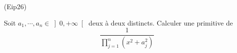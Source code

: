 \begin{tiny}(Eip26)\end{tiny} Soit $a_1,\cdots,a_n \in \left] 0, +\infty \right[$ deux à deux distincts. Calculer une primitive de
\begin{displaymath}
 \frac{1}{
\prod_{j=1}^n(x^2+a_j^2)
}
\end{displaymath}
 